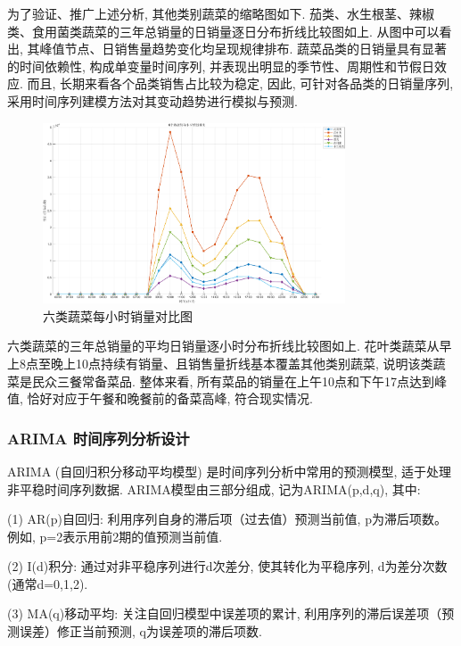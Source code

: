 \documentclass{cumcmthesis}
\begin{document}
为了验证、推广上述分析, 其他类别蔬菜的缩略图如下. 茄类、水生根茎、辣椒类、食用菌类蔬菜的三年总销量的日销量逐日分布折线比较图如上. 从图中可以看出, 其峰值节点、日销售量趋势变化均呈现规律排布. 蔬菜品类的日销量具有显著的时间依赖性, 构成单变量时间序列, 并表现出明显的季节性、周期性和节假日效应. 而且, 长期来看各个品类销售占比较为稳定, 因此, 可针对各品类的日销量序列, 采用时间序列建模方法对其变动趋势进行模拟与预测.

\begin{figure}[H]
    \centering
    \includegraphics[width=0.8\textwidth]{6个数据集每小时销量对比.png} 
    \caption{六类蔬菜每小时销量对比图}
\end{figure}

六类蔬菜的三年总销量的平均日销量逐小时分布折线比较图如上. 花叶类蔬菜从早上8点至晚上10点持续有销量、且销售量折线基本覆盖其他类别蔬菜, 说明该类蔬菜是民众三餐常备菜品. 整体来看, 所有菜品的销量在上午10点和下午17点达到峰值, 恰好对应于午餐和晚餐前的备菜高峰, 符合现实情况.

\subsubsection{ARIMA 时间序列分析设计}

ARIMA (自回归积分移动平均模型) 是时间序列分析中常用的预测模型, 适于处理非平稳时间序列数据. 
ARIMA模型由三部分组成, 记为ARIMA(p,d,q), 其中: 


(1) AR(p)自回归: 利用序列自身的滞后项（过去值）预测当前值, p为滞后项数。例如, p=2表示用前2期的值预测当前值. 

(2) I(d)积分: 通过对非平稳序列进行d次差分, 使其转化为平稳序列, d为差分次数 (通常d=0,1,2). 

(3) MA(q)移动平均: 关注自回归模型中误差项的累计, 利用序列的滞后误差项（预测误差）修正当前预测, q为误差项的滞后项数. 
\end{document}
